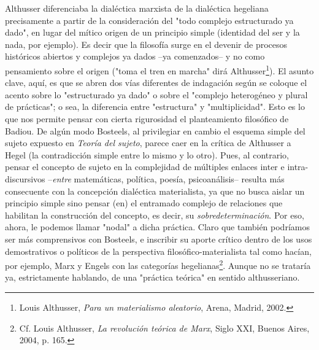 Althusser diferenciaba la dialéctica marxista de la dialéctica hegeliana
precisamente a partir de la consideración del "todo complejo
estructurado ya dado", en lugar del mítico origen de un principio simple
(identidad del ser y la nada, por ejemplo). Es decir que la filosofía
surge en el devenir de procesos históricos abiertos y complejos ya dados
--ya comenzados-- y no como pensamiento sobre el origen ("toma el tren
en marcha" dirá Althusser\footnote{Louis Althusser, \emph{Para un
  materialismo aleatorio}, Arena, Madrid, 2002.}). El asunto clave,
aquí, es que se abren dos vías diferentes de indagación según se coloque
el acento sobre lo "estructurado ya dado" o sobre el "complejo
heterogéneo y plural de prácticas"; o sea, la diferencia entre
"estructura" y "multiplicidad". Esto es lo que nos permite pensar con
cierta rigurosidad el planteamiento filosófico de Badiou. De algún modo
Bosteels, al privilegiar en cambio el esquema simple del sujeto expuesto
en \emph{Teoría del sujeto}, parece caer en la crítica de Althusser a
Hegel (la contradicción simple entre lo mismo y lo otro). Pues, al
contrario, pensar el concepto de sujeto en la complejidad de múltiples
enlaces inter e intra-discursivos --\emph{entre} matemáticas, política,
poesía, psicoanálisis-- resulta más consecuente con la concepción
dialéctica materialista, ya que no busca aislar un principio simple sino
pensar (en) el entramado complejo de relaciones que habilitan la
construcción del concepto, es decir, su \emph{sobredeterminación}. Por
eso, ahora, le podemos llamar "nodal" a dicha práctica. Claro que
también podríamos ser más comprensivos con Bosteels, e inscribir su
aporte crítico dentro de los usos demostrativos o políticos de la
perspectiva filosófico-materialista tal como hacían, por ejemplo, Marx y
Engels con las categorías hegelianas\footnote{Cf. Louis Althusser,
  \emph{La revolución teórica de Marx}, Siglo XXI, Buenos Aires, 2004,
  p. 165.}. Aunque no se trataría ya, estrictamente hablando, de una
"práctica teórica" en sentido althusseriano.

